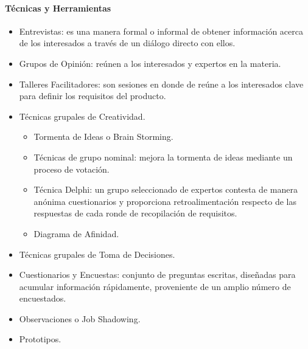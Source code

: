 \documentclass[a4paper,twosides]{article}
\newlength{\wideitemsep}
\let\olditem\item
\renewcommand{\item}{\setlength{\itemsep}{\wideitemsep}\olditem}
\begin{document}
\paragraph{Técnicas y Herramientas}
\begin{itemize}
\item Entrevistas: es una manera formal o informal de obtener información acerca de los interesados a través de un diálogo directo con ellos.
\item Grupos de Opinión: reúnen a los interesados y expertos en la materia.
\item Talleres Facilitadores: son sesiones en donde de reúne a los interesados clave para definir los requisitos del producto.
\item Técnicas grupales de Creatividad.
\begin{itemize}
\item Tormenta de Ideas o Brain Storming.
\item Técnicas de grupo nominal: mejora la tormenta de ideas mediante un proceso de votación.
\item Técnica Delphi: un grupo seleccionado de expertos contesta de manera anónima cuestionarios y proporciona retroalimentación respecto de las respuestas de cada ronde de recopilación de requisitos.
\item Diagrama de Afinidad.
\end{itemize}
\item Técnicas grupales de Toma de Decisiones.
\item Cuestionarios y Encuestas: conjunto de preguntas escritas, diseñadas para acumular información rápidamente, proveniente de un amplio número de encuestados.
\item Observaciones o Job Shadowing.
\item Prototipos.
\end{itemize}
\end{document}
